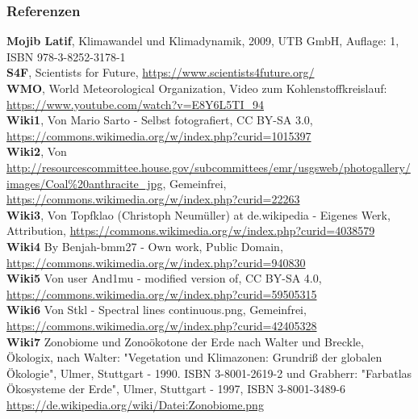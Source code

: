 \begin{frame}
	\frametitle{Referenzen}
	\small{
	\textbf{Mojib Latif}, Klimawandel und Klimadynamik, 2009, UTB GmbH, Auflage: 1, ISBN 978-3-8252-3178-1\\
	\textbf{S4F}, Scientists for Future, \url{https://www.scientists4future.org/}\\
	\textbf{WMO}, World Meteorological Organization, Video zum Kohlenstoffkreislauf: \url{https://www.youtube.com/watch?v=E8Y6L5TI\_94}\\
	\textbf{Wiki1}, Von Mario Sarto - Selbst fotografiert, CC BY-SA 3.0, \url{https://commons.wikimedia.org/w/index.php?curid=1015397}\\
	\textbf{Wiki2}, Von \url{http://resourcescommittee.house.gov/subcommittees/emr/usgsweb/photogallery/images/Coal\%20anthracite\_jpg}, Gemeinfrei, \url{https://commons.wikimedia.org/w/index.php?curid=22263}\\
	\textbf{Wiki3}, Von Topfklao (Christoph Neumüller) at de.wikipedia - Eigenes Werk, Attribution, \url{https://commons.wikimedia.org/w/index.php?curid=4038579}\\
	\textbf{Wiki4} By Benjah-bmm27 - Own work, Public Domain, \url{https://commons.wikimedia.org/w/index.php?curid=940830}\\
	\textbf{Wiki5} Von user And1mu - modified version of, CC BY-SA 4.0, \url{https://commons.wikimedia.org/w/index.php?curid=59505315}\\
	\textbf{Wiki6} Von Stkl - Spectral lines continuous.png, Gemeinfrei, \url{https://commons.wikimedia.org/w/index.php?curid=42405328}\\
	\textbf{Wiki7} Zonobiome und Zonoökotone der Erde nach Walter und Breckle, Ökologix, nach Walter: "Vegetation und Klimazonen: Grundriß der globalen Ökologie", Ulmer, Stuttgart - 1990. ISBN 3-8001-2619-2 und Grabherr: "Farbatlas Ökosysteme der Erde", Ulmer, Stuttgart - 1997, ISBN 3-8001-3489-6 \url{https://de.wikipedia.org/wiki/Datei:Zonobiome.png}
	}
\end{frame}

